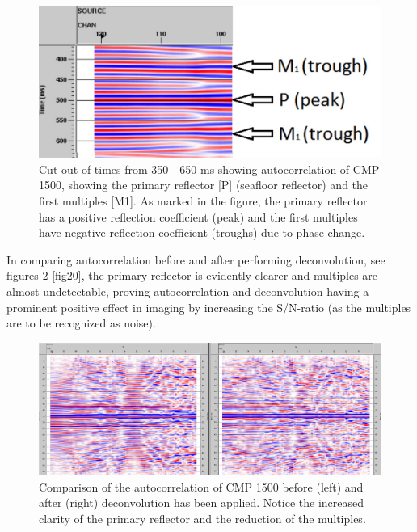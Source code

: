 \documentclass[10pt,a4paper]{article}
\begin{document}
\begin{figure}[H]
\centering
\includegraphics[width=\textwidth]{fig17.jpg}
\caption{Cut-out of times from 350 - 650 ms showing autocorrelation of CMP 1500, showing the primary reflector [P] (seafloor reflector) and the first multiples [M1]. As marked in the figure, the primary reflector has a positive reflection coefficient (peak) and the first multiples have negative reflection coefficient (troughs) due to phase change.}
\label{fig17}
\end{figure}

\noindent In comparing autocorrelation before and after performing deconvolution, see figures \ref{fig18}-\ref{fig20}, the primary reflector is evidently clearer and multiples are almost undetectable, proving autocorrelation and deconvolution having a prominent positive effect in imaging by increasing the S/N-ratio (as the multiples are to be recognized as noise).

\begin{figure}[H]
\includegraphics[width=\textwidth]{fig18.jpg}
\caption{Comparison of the autocorrelation of CMP 1500 before (left) and after (right) deconvolution has been applied. Notice the increased clarity of the primary reflector and the reduction of the multiples.}
\label{fig18}
\end{figure}
\end{document}
